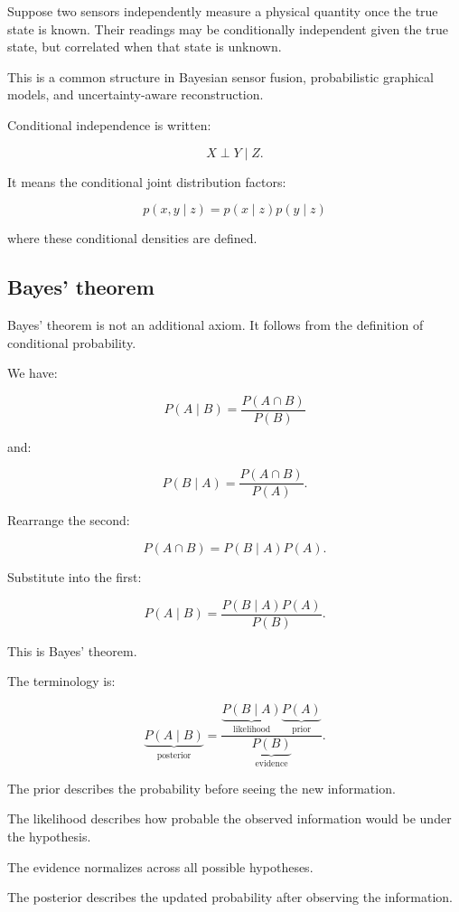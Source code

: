 Suppose two sensors independently measure a physical quantity once the true state is known. Their readings may be conditionally independent given the true state, but correlated when that state is unknown.

This is a common structure in Bayesian sensor fusion, probabilistic graphical models, and uncertainty-aware reconstruction.

Conditional independence is written:

\[
 X\perp Y\mid Z.
\]

It means the conditional joint distribution factors:

\[
 p(x,y\mid z)=p(x\mid z)p(y\mid z)
\]

where these conditional densities are defined.

\subsection{Bayes' theorem}\label{02-foundations-ii-ch023-bayes-theorem}

Bayes' theorem is not an additional axiom. It follows from the definition of conditional probability.

We have:

\[
 P(A\mid B)=\frac{P(A\cap B)}{P(B)}
\]

and:

\[
 P(B\mid A)=\frac{P(A\cap B)}{P(A)}.
\]

Rearrange the second:

\[
 P(A\cap B)=P(B\mid A)P(A).
\]

Substitute into the first:

\[
 \boxed{ P(A\mid B) = \frac{P(B\mid A)P(A)}{P(B)} }.
\]

This is Bayes' theorem.

The terminology is:

\[
 \underbrace{P(A\mid B)}_{\text{posterior}} = \frac{ \underbrace{P(B\mid A)}_{\text{likelihood}} \underbrace{P(A)}_{\text{prior}} }{ \underbrace{P(B)}_{\text{evidence}} }.
\]

The prior describes the probability before seeing the new information.

The likelihood describes how probable the observed information would be under the hypothesis.

The evidence normalizes across all possible hypotheses.

The posterior describes the updated probability after observing the information.

